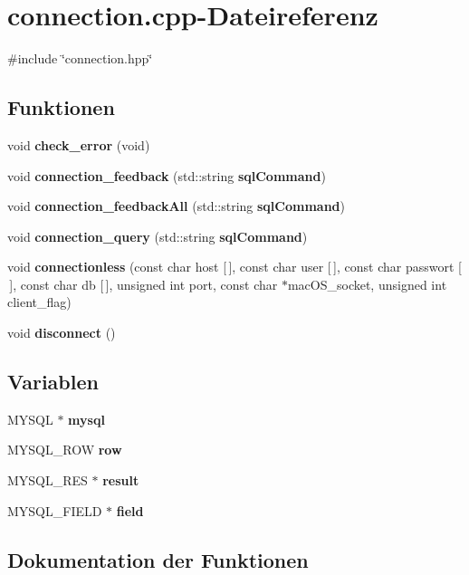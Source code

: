 \section{connection.\+cpp-\/\+Dateireferenz}
\label{connection_8cpp}
{\ttfamily \#include \char`\"{}connection.\+hpp\char`\"{}}\newline
\subsection*{Funktionen}
\begin{DoxyCompactItemize}
\item 
void \textbf{ check\+\_\+error} (void)
\item 
void \textbf{ connection\+\_\+feedback} (std\+::string \textbf{ sql\+Command})
\item 
void \textbf{ connection\+\_\+feedback\+All} (std\+::string \textbf{ sql\+Command})
\item 
void \textbf{ connection\+\_\+query} (std\+::string \textbf{ sql\+Command})
\item 
void \textbf{ connectionless} (const char host [$\,$], const char user [$\,$], const char passwort [$\,$], const char db [$\,$], unsigned int port, const char $\ast$mac\+O\+S\+\_\+socket, unsigned int client\+\_\+flag)
\item 
void \textbf{ disconnect} ()
\end{DoxyCompactItemize}
\subsection*{Variablen}
\begin{DoxyCompactItemize}
\item 
M\+Y\+S\+QL $\ast$ \textbf{ mysql}
\item 
M\+Y\+S\+Q\+L\+\_\+\+R\+OW \textbf{ row}
\item 
M\+Y\+S\+Q\+L\+\_\+\+R\+ES $\ast$ \textbf{ result}
\item 
M\+Y\+S\+Q\+L\+\_\+\+F\+I\+E\+LD $\ast$ \textbf{ field}
\end{DoxyCompactItemize}


\subsection{Dokumentation der Funktionen}
\mbox{\label{connection_8cpp_a33fd832a9e1a27bddb7d9837a2dcf2f1}} 
